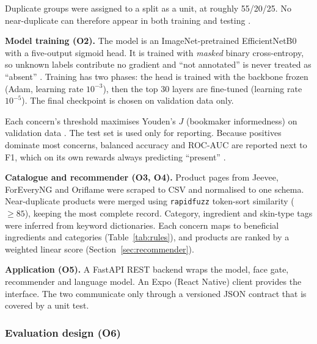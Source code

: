 Duplicate groups were assigned to a split as a unit, at roughly 55/20/25. No near-duplicate can therefore appear in both training and testing \citep{barz2020,kapoor2023}.

\textbf{Model training (O2).} The model is an ImageNet-pretrained EfficientNetB0 \citep{tan2019} with a five-output sigmoid head. It is trained with \emph{masked} binary cross-entropy, so unknown labels contribute no gradient and ``not annotated'' is never treated as ``absent'' \citep{liu2022multilabel}. Training has two phases: the head is trained with the backbone frozen (Adam, learning rate $10^{-3}$), then the top 30 layers are fine-tuned (learning rate $10^{-5}$). The final checkpoint is chosen on validation data only.

Each concern's threshold maximises Youden's $J$ (bookmaker informedness) on validation data \citep{chicco2021}. The test set is used only for reporting. Because positives dominate most concerns, balanced accuracy and ROC-AUC are reported next to F1, which on its own rewards always predicting ``present'' \citep{chicco2020}.

\textbf{Catalogue and recommender (O3, O4).} Product pages from Jeevee, ForEveryNG and Oriflame were scraped to CSV and normalised to one schema. Near-duplicate products were merged using \texttt{rapidfuzz} token-sort similarity ($\geq 85$), keeping the most complete record. Category, ingredient and skin-type tags were inferred from keyword dictionaries. Each concern maps to beneficial ingredients and categories (Table~\ref{tab:rules}), and products are ranked by a weighted linear score (Section~\ref{sec:recommender}).

\textbf{Application (O5).} A FastAPI REST backend wraps the model, face gate, recommender and language model. An Expo (React Native) client provides the interface. The two communicate only through a versioned JSON contract that is covered by a unit test.

\subsubsection*{Evaluation design (O6)}

